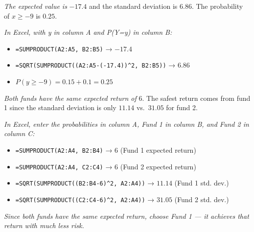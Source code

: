 \documentclass[
  11pt,
  letterpaper,
  DIV=11,
  numbers=noendperiod,
  oneside,
  open=any]{scrreprt}
\providecommand{\tightlist}{%
  \setlength{\itemsep}{0pt}\setlength{\parskip}{0pt}}\usepackage{longtable,booktabs,array}
\newenvironment{bsanswerkey}[2]{%
  \begin{tcolorbox}[bsbase, colback=bspaper2, colframe=bsline, fontupper=\small,
    title={\hypertarget{a-#1}{}\label{a-#1}\hyperlink{q-#1}{\textcolor{bsink2}{\MakeUppercase{#2}}}\hfill
      \hyperlink{q-#1}{\textcolor{bsaccent}{\normalfont\footnotesize back to page \pageref{q-#1}}}}]}%
  {\end{tcolorbox}}
\begin{document}
\begin{bsanswerkey}{bsans85}{Exercise 1, question 2}

\emph{The expected value is} \(-17.4\) and the standard deviation is
\(6.86\). The probability of \(x \geq -9\) is \(0.25\).

\emph{In Excel, with y in column A and P(Y=y) in column B:}

\begin{itemize}
\tightlist
\item
  \texttt{=SUMPRODUCT(A2:A5,\ B2:B5)} → \(-17.4\)
\item
  \texttt{=SQRT(SUMPRODUCT((A2:A5-(-17.4))\^{}2,\ B2:B5))} → \(6.86\)
\item
  \(P(y \geq -9) = 0.15 + 0.1 = 0.25\)
\end{itemize}

\end{bsanswerkey}

\begin{bsanswerkey}{bsans86}{Exercise 1, question 3}

\emph{Both funds have the same expected return of} \(6\). The safest
return comes from fund 1 since the standard deviation is only \(11.14\)
vs.~\(31.05\) for fund 2.

\emph{In Excel, enter the probabilities in column A, Fund 1 in column B,
and Fund 2 in column C:}

\begin{itemize}
\tightlist
\item
  \texttt{=SUMPRODUCT(A2:A4,\ B2:B4)} → \(6\) (Fund 1 expected return)
\item
  \texttt{=SUMPRODUCT(A2:A4,\ C2:C4)} → \(6\) (Fund 2 expected return)
\item
  \texttt{=SQRT(SUMPRODUCT((B2:B4-6)\^{}2,\ A2:A4))} → \(11.14\) (Fund 1
  std. dev.)
\item
  \texttt{=SQRT(SUMPRODUCT((C2:C4-6)\^{}2,\ A2:A4))} → \(31.05\) (Fund 2
  std. dev.)
\end{itemize}

\emph{Since both funds have the same expected return, choose Fund 1 ---
it achieves that return with much less risk.}

\end{bsanswerkey}
\end{document}
